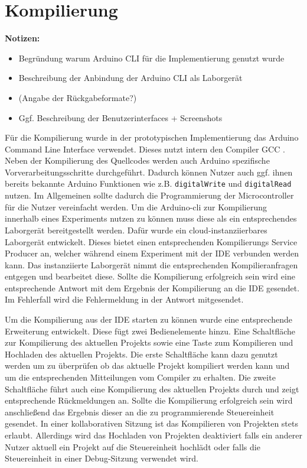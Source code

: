 \section{Kompilierung}\label{section:prototypische-implementierung:kompilierung}

\begin{note}
    \textbf{Notizen:}
    \begin{itemize}
        \item Begründung warum Arduino CLI für die Implementierung genutzt wurde
        \item Beschreibung der Anbindung der Arduino CLI als Laborgerät
        \item (Angabe der Rückgabeformate?)
        \item Ggf. Beschreibung der Benutzerinterfaces + Screenshots
    \end{itemize}
\end{note}

Für die Kompilierung wurde in der prototypischen Implementierung das Arduino Command Line Interface \cite{noauthor_arduino-cli_nodate} verwendet. Dieses nutzt intern den Compiler \ac{GCC} \cite{noauthor_gcc_nodate}. Neben der Kompilierung des Quellcodes werden auch Arduino spezifische Vorverarbeitungsschritte durchgeführt. Dadurch können Nutzer auch ggf. ihnen bereits bekannte Arduino Funktionen wie z.B. \texttt{digitalWrite} und \texttt{digitalRead} nutzen. Im Allgemeinen sollte dadurch die Programmierung der Microcontroller für die Nutzer vereinfacht werden. Um die Arduino-cli zur Kompilierung innerhalb eines Experiments nutzen zu können muss diese als ein entsprechendes Laborgerät bereitgestellt werden. Dafür wurde ein cloud-instanziierbares Laborgerät entwickelt. Dieses bietet einen entsprechenden Kompilierungs Service Producer an, welcher während einem Experiment mit der IDE verbunden werden kann. Das instanziierte Laborgerät nimmt die entsprechenden Kompilieranfragen entgegen und bearbeitet diese. Sollte die Kompilierung erfolgreich sein wird eine entsprechende Antwort mit dem Ergebnis der Kompilierung an die IDE gesendet. Im Fehlerfall wird die Fehlermeldung in der Antwort mitgesendet.

Um die Kompilierung aus der IDE starten zu können wurde eine entsprechende Erweiterung entwickelt. Diese fügt zwei Bedienelemente hinzu. Eine Schaltfläche zur Kompilierung des aktuellen Projekts sowie eine Taste zum Kompilieren und Hochladen des aktuellen Projekts. Die erste Schaltfläche kann dazu genutzt werden um zu überprüfen ob das aktuelle Projekt kompiliert werden kann und um die entsprechenden Mitteilungen vom Compiler zu erhalten. Die zweite Schaltfläche führt auch eine Kompilierung des aktuellen Projekts durch und zeigt entsprechende Rückmeldungen an. Sollte die Kompilierung erfolgreich sein wird anschließend das Ergebnis dieser an die zu programmierende Steuereinheit gesendet. In einer kollaborativen Sitzung ist das Kompilieren von Projekten stets erlaubt. Allerdings wird das Hochladen von Projekten deaktiviert falls ein anderer Nutzer aktuell ein Projekt auf die Steuereinheit hochlädt oder falls die Steuereinheit in einer Debug-Sitzung verwendet wird.
